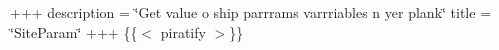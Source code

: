 +++ description = \char`\"{}\+Get value o\textquotesingle{} ship parrrams varrriables \textquotesingle{}n yer plank\char`\"{} title = \char`\"{}\+Site\+Param\char`\"{} +++ \{\{$<$ piratify $>$\}\} 